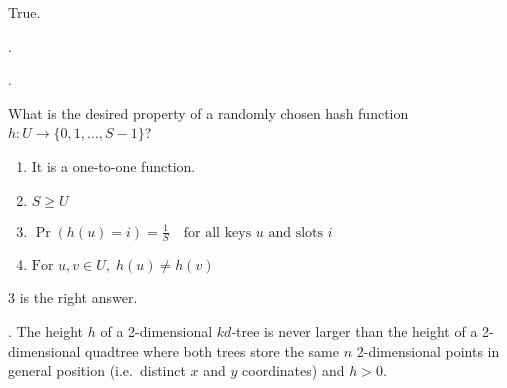 \documentclass{article}
\begin{document}
\begin{solution}
    True. 
\end{solution}

\begin{exer}[]. 
    \begin{cate}. \end{cate}
    What is the desired property of a randomly chosen hash function $h : U \rightarrow \{ 0, 1, \ldots, S-1 \}$? \begin{enumerate}
        \item It is a one-to-one function. 
        \item $S \geq U$ 
        \item $\Pr(h(u) = i) = \frac{1}{S} \quad \text{for all keys } u \text{ and slots } i$
        \item $\text{For } u, v \in U, \; h(u) \ne h(v)$
    \end{enumerate}
\end{exer}

\begin{solution}
    3 is the right answer. 
\end{solution}

\begin{exer}[].
    The height $h$ of a 2-dimensional $kd$-tree is never larger than the height of a 2-dimensional quadtree where both trees store the same $n$ 2-dimensional points in general position (i.e.\ distinct $x$ and $y$ coordinates) and $h > 0$.
\end{exer}





















\printindex
\end{document}
